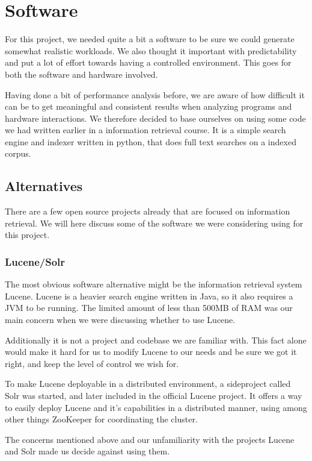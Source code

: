 \clearpage
\section{Software}
\label{sec:software}
For this project, we needed quite a bit a software to be sure we could generate somewhat realistic workloads.
We also thought it important with predictability and put a lot of effort towards having a controlled environment. This goes for both the software and hardware involved.

Having done a bit of performance analysis before, we are aware of how difficult it can be to get meaningful and consistent results when analyzing programs and hardware interactions. We therefore decided to base ourselves on using some code we had written earlier in a information retrieval course. It is a simple search engine and indexer written in python, that does full text searches on a indexed corpus.

\subsection{Alternatives}
There are a few open source projects already that are focused on information retrieval. We will here discuss some of the software we were considering using for this project.

\subsubsection{Lucene/Solr}
The most obvious software alternative might be the information retrieval system Lucene. Lucene is a heavier search engine written in Java, so it also requires a JVM to be running. The limited amount of less than 500MB of RAM was our main concern when we were discussing whether to use Lucene.

Additionally it is not a project and codebase we are familiar with.
This fact alone would make it hard for us to modify Lucene to our needs and be sure we got it right, and keep the level of control we wish for.

To make Lucene deployable in a distributed environment, a sideproject called Solr was started, and later included in the official Lucene project.
It offers a way to easily deploy Lucene and it's capabilities in a distributed manner, using among other things ZooKeeper for coordinating the cluster.

The concerns mentioned above and our unfamiliarity with the projects Lucene and Solr made us decide against using them.

